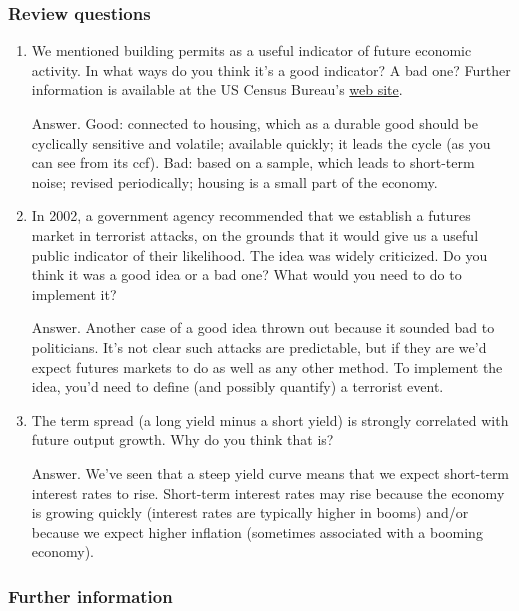 \documentclass[letterpaper,12pt]{article}
\begin{document}
\subsubsection*{Review questions}

\begin{enumerate}

\item We mentioned building permits as a useful indicator 
of future economic activity. 
In what ways do you think it's a good indicator?  A bad one?  
Further information is available at the US Census Bureau's
\href{http://www.census.gov/const/www/newresconstindex.html}
{web site}.

Answer.  Good:  connected to housing, which as a durable good
should be cyclically sensitive and volatile; available quickly; it
leads the cycle (as you can see from its ccf). Bad: based on a sample,
which leads to short-term noise; revised periodically; 
housing is a small part of the economy.

\item In 2002, a government agency recommended that we establish a
futures market in terrorist attacks, on the grounds that it would
give us a useful public indicator of their likelihood.  The idea
was widely criticized.  Do you think it was a good idea or a bad
one?  What would you need to do to implement it?

Answer.  Another case of a good idea thrown out because it sounded
bad to politicians.  It's not clear such attacks are predictable,
but if they are we'd expect futures markets to do as well as any
other method.  To implement the idea, you'd need to define (and
possibly quantify) a terrorist event.

\item The term spread (a long yield minus a short yield) 
is strongly correlated with future output growth.  Why do you think that is?

Answer.  We've seen that a steep yield curve means that we expect
short-term interest rates to rise.  Short-term interest rates may
rise because the economy is growing quickly (interest rates are
typically higher in booms) and/or because we expect higher
inflation (sometimes associated with a booming economy).

\end{enumerate}


\subsubsection*{Further information}
\end{document}
